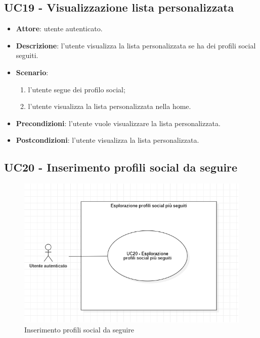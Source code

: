 \subsection{UC19 - Visualizzazione lista personalizzata}
\begin{itemize}
    \item \textbf{Attore}: utente autenticato.
    \item \textbf{Descrizione}: l'utente visualizza la lista personalizzata se ha dei profili social seguiti.
    \item \textbf{Scenario}:
    \begin{enumerate}
        \item l'utente segue dei profilo social;
        \item l'utente visualizza la lista personalizzata nella home.
    \end{enumerate}

    \item \textbf{Precondizioni}: l'utente vuole visualizzare la lista personalizzata.
    \item \textbf{Postcondizioni}: l'utente visualizza la lista personalizzata.
\end{itemize}

\subsection{UC20 - Inserimento profili social da seguire}
\begin{figure}[H]
    \includegraphics[width=15cm]{sezioni/Images/UC20.png}
    \centering
    \caption{Inserimento profili social da seguire}
\end{figure}

